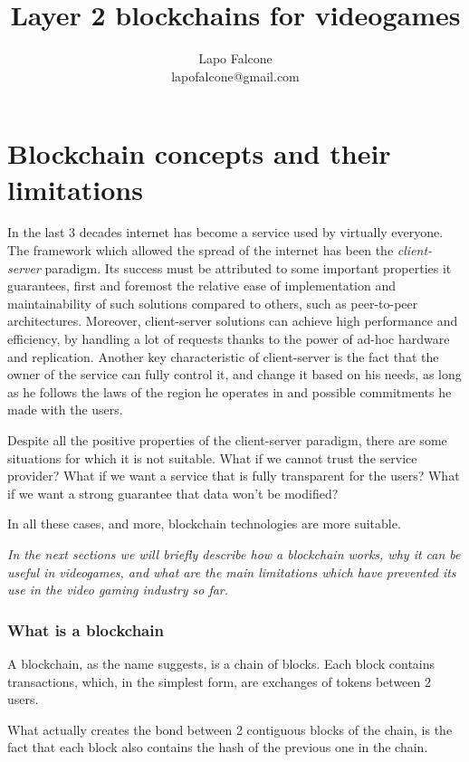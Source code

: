 \documentclass[12pt]{article}
\title{Layer 2 blockchains for videogames}
\author{Lapo Falcone \\ lapofalcone@gmail.com}
\begin{document}
\maketitle
\tableofcontents

\newpage

\part{Blockchain concepts and their limitations} \label{part:bcatl}
In the last 3 decades internet has become a service used by virtually everyone. The framework which allowed the spread of the internet has been the \textit{client-server} paradigm.
Its success must be attributed to some important properties it guarantees, first and foremost the relative ease of implementation and maintainability of such solutions compared to others, such as peer-to-peer architectures.
Moreover, client-server solutions can achieve high performance and efficiency, by handling a lot of requests thanks to the power of ad-hoc hardware and replication. 
Another key characteristic of client-server is the fact that the owner of the service can fully control it, and change it based on his needs, as long as he follows the laws of the region he operates in and possible commitments he made with the users.

Despite all the positive properties of the client-server paradigm, there are some situations for which it is not suitable. 
What if we cannot trust the service provider? What if we want a service that is fully transparent for the users? What if we want a strong guarantee that data won't be modified?

In all these cases, and more, blockchain technologies are more suitable.

\emph{In the next sections we will briefly describe how a blockchain works, why it can be useful in videogames, and what are the main limitations which have prevented its use in the video gaming industry so far.}

\section {What is a blockchain} \label{section:wiab}
A blockchain, as the name suggests, is a chain of blocks. Each block contains transactions, which, in the simplest form, are exchanges of tokens between 2 users.

What actually creates the bond between 2 contiguous blocks of the chain, is the fact that each block also contains the hash of the previous one in the chain.
\end{document}
